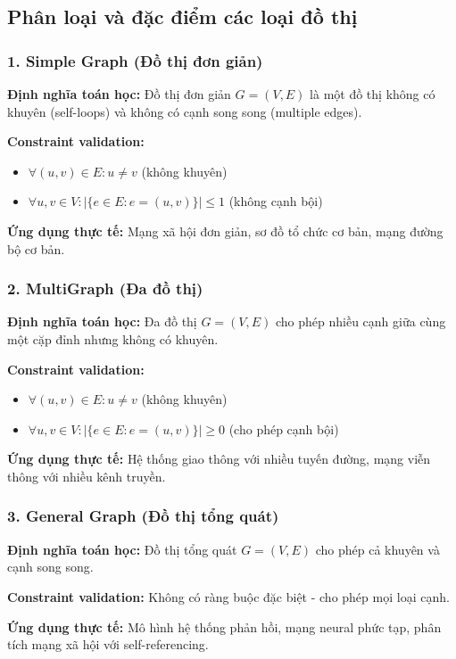 \documentclass[12pt]{article}
\begin{document}
\subsection*{Phân loại và đặc điểm các loại đồ thị}

\subsubsection*{1. Simple Graph (Đồ thị đơn giản)}
\textbf{Định nghĩa toán học:} Đồ thị đơn giản $G = (V, E)$ là một đồ thị không có khuyên (self-loops) và không có cạnh song song (multiple edges).

\textbf{Constraint validation:}
\begin{itemize}
  \item $\forall (u, v) \in E: u \neq v$ (không khuyên)
  \item $\forall u, v \in V: |\{e \in E : e = (u, v)\}| \leq 1$ (không cạnh bội)
\end{itemize}

\textbf{Ứng dụng thực tế:} Mạng xã hội đơn giản, sơ đồ tổ chức cơ bản, mạng đường bộ cơ bản.

\subsubsection*{2. MultiGraph (Đa đồ thị)}
\textbf{Định nghĩa toán học:} Đa đồ thị $G = (V, E)$ cho phép nhiều cạnh giữa cùng một cặp đỉnh nhưng không có khuyên.

\textbf{Constraint validation:}
\begin{itemize}
  \item $\forall (u, v) \in E: u \neq v$ (không khuyên)
  \item $\forall u, v \in V: |\{e \in E : e = (u, v)\}| \geq 0$ (cho phép cạnh bội)
\end{itemize}

\textbf{Ứng dụng thực tế:} Hệ thống giao thông với nhiều tuyến đường, mạng viễn thông với nhiều kênh truyền.

\subsubsection*{3. General Graph (Đồ thị tổng quát)}
\textbf{Định nghĩa toán học:} Đồ thị tổng quát $G = (V, E)$ cho phép cả khuyên và cạnh song song.

\textbf{Constraint validation:} Không có ràng buộc đặc biệt - cho phép mọi loại cạnh.

\textbf{Ứng dụng thực tế:} Mô hình hệ thống phản hồi, mạng neural phức tạp, phân tích mạng xã hội với self-referencing.
\end{document}
